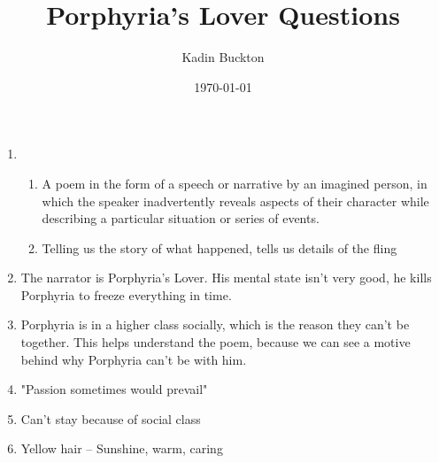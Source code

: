 \documentclass[11pt]{article}
\author{Kadin Buckton}
\date{\today}
\title{Porphyria's Lover Questions}
\begin{document}
\maketitle
\tableofcontents

\begin{enumerate}
\item \begin{enumerate}
\item A poem in the form of a speech or narrative by an imagined person, in which the speaker inadvertently reveals aspects of their character while describing a particular situation or series of events.
\item Telling us the story of what happened, tells us details of the fling
\end{enumerate}
\item The narrator is Porphyria's Lover. His mental state isn't very good, he kills Porphyria to freeze everything in time.
\item Porphyria is in a higher class socially, which is the reason they can't be together. This helps understand the poem, because we can see a motive behind why Porphyria can't be with him.
\item "Passion sometimes would prevail"
\item Can't stay because of social class
\item Yellow hair -- Sunshine, warm, caring
\end{enumerate}
\end{document}

